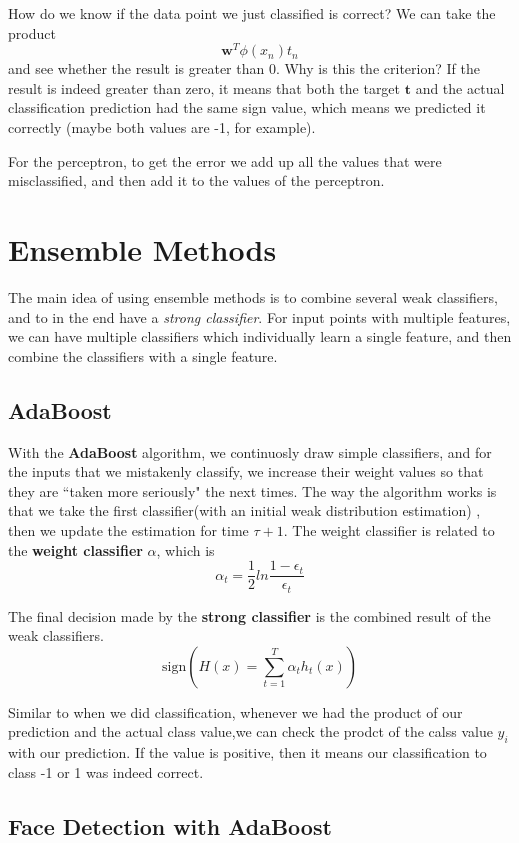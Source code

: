 \documentclass{tufte-handout}
\renewcommand{\vec}[1]{\mathbf{#1}}
\begin{document}
How do we know if the data point we just classified is correct? 
We can take the product 
\[ \vec{w}^{T}\phi(x_{n})t_{n}\]
and see whether the result is greater than 0. 
Why is this the criterion?
If the result is indeed greater than zero, it means that both the target $\vec{t}$ and the actual classification
	prediction had the same sign value, which means we predicted it correctly (maybe both values are -1, for
	example).

For the perceptron, to get the error we add up all the values that were misclassified, and then add it to the 
	values of the perceptron.
\section{Ensemble Methods}
The main idea of using ensemble methods is to combine several weak classifiers, and to in the end have a 
	\textit{strong classifier}.
For input points with multiple features, we can have multiple classifiers which individually learn 
	a single feature, and then combine the classifiers with a single feature.

\subsection{AdaBoost}
	With the \textbf{AdaBoost} algorithm, we continuosly draw simple classifiers, and for the inputs that we
		mistakenly classify, we increase their weight values so that they are ``taken more seriously" the
		next times.
	The way the algorithm works is that we take the first classifier(with an initial weak distribution estimation)
		, then we update the estimation for time $\tau + 1$.
	The weight classifier is related to the \textbf{weight classifier} $\alpha$, which is 
	\[ \alpha_{t} = \frac{1}{2}ln\frac{1-\epsilon_{t}}{\epsilon_{t}}\]

	The final decision made by the \textbf{strong classifier} is the combined result of the weak classifiers.
	\[ \textrm{sign}(H(x) = \sum_{t=1}^{T}\alpha_{t}h_{t}(x))\]

	Similar to when we did classification, whenever we had the product of our prediction and the actual 
	class value,we can check the prodct of the calss value $y_{i}$ with our prediction. 
	If the value is positive, then it means our classification to class -1 or 1 was indeed correct.

\subsection{Face Detection with AdaBoost}
\end{document}
